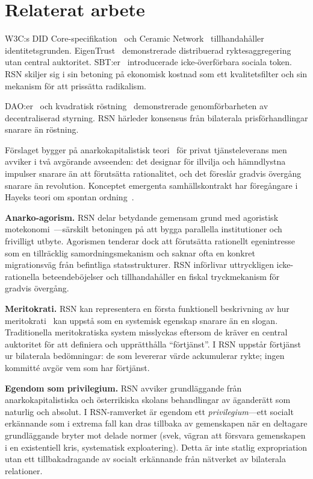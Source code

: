 \documentclass[11pt,a4paper,twocolumn]{article}
\begin{document}
\section{Relaterat arbete}

W3C:s DID Core-specifikation~\cite{did2022} och Ceramic Network~\cite{ceramic2023} tillhandahåller identitetsgrunden. EigenTrust~\cite{kamvar2003} demonstrerade distribuerad ryktesaggregering utan central auktoritet. SBT:er~\cite{weyl2022} introducerade icke-överförbara sociala token. RSN skiljer sig i sin betoning på ekonomisk kostnad som ett kvalitetsfilter och sin mekanism för att prissätta radikalism.

DAO:er~\cite{buterin2014} och kvadratisk röstning~\cite{buterin2019} demonstrerade genomförbarheten av decentraliserad styrning. RSN härleder konsensus från bilaterala prisförhandlingar snarare än röstning.

Förslaget bygger på anarkokapitalistisk teori~\cite{rothbard1973,hoppe2001} för privat tjänsteleverans men avviker i två avgörande avseenden: det designar för illvilja och hämndlystna impulser snarare än att förutsätta rationalitet, och det föreslår gradvis övergång snarare än revolution. Konceptet emergenta samhällskontrakt har föregångare i Hayeks teori om spontan ordning~\cite{hayek1973}.

\textbf{Anarko-agorism.} RSN delar betydande gemensam grund med agoristisk motekonomi~\cite{konkin2006}---särskilt betoningen på att bygga parallella institutioner och frivilligt utbyte. Agorismen tenderar dock att förutsätta rationellt egenintresse som en tillräcklig samordningsmekanism och saknar ofta en konkret migrationsväg från befintliga statsstrukturer. RSN införlivar uttryckligen icke-rationella beteendeböjelser och tillhandahåller en fiskal tryckmekanism för gradvis övergång.

\textbf{Meritokrati.} RSN kan representera en första funktionell beskrivning av hur meritokrati~\cite{young1958} kan uppstå som en systemisk egenskap snarare än en slogan. Traditionella meritokratiska system misslyckas eftersom de kräver en central auktoritet för att definiera och upprätthålla ``förtjänst''. I RSN uppstår förtjänst ur bilaterala bedömningar: de som levererar värde ackumulerar rykte; ingen kommitté avgör vem som har förtjänst.

\textbf{Egendom som privilegium.} RSN avviker grundläggande från anarkokapitalistiska och österrikiska skolans behandlingar av äganderätt som naturlig och absolut. I RSN-ramverket är egendom ett \emph{privilegium}---ett socialt erkännande som i extrema fall kan dras tillbaka av gemenskapen när en deltagare grundläggande bryter mot delade normer (svek, vägran att försvara gemenskapen i en existentiell kris, systematisk exploatering). Detta är inte statlig expropriation utan ett tillbakadragande av socialt erkännande från nätverket av bilaterala relationer.
\end{document}

